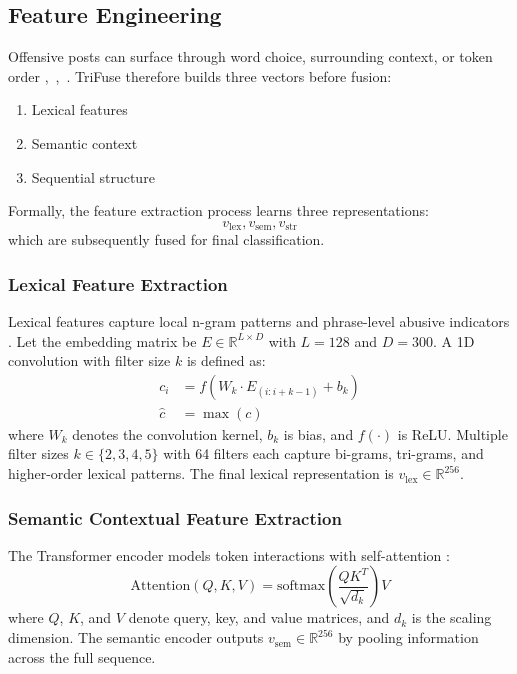 \subsection{Feature Engineering}

Offensive posts can surface through word choice, surrounding context, or token order \cite{ref7},~\cite{ref8},~\cite{ref9}. TriFuse therefore builds three vectors before fusion:
\begin{enumerate}
\item Lexical features
\item Semantic context
\item Sequential structure
\end{enumerate}

Formally, the feature extraction process learns three representations:
\[
v_{\mathrm{lex}}, v_{\mathrm{sem}}, v_{\mathrm{str}}
\]
which are subsequently fused for final classification.

\subsubsection{Lexical Feature Extraction}

Lexical features capture local n-gram patterns and phrase-level abusive indicators \cite{ref7}. Let the embedding matrix be $E \in \mathbb{R}^{L \times D}$ with $L=128$ and $D=300$. A 1D convolution with filter size $k$ is defined as:
\begin{equation}
\begin{aligned}
c_i &= f(W_k \cdot E_{(i:i + k - 1)} + b_k) \\
\hat{c} &= \max(c)
\end{aligned}
\end{equation}
where $W_k$ denotes the convolution kernel, $b_k$ is bias, and $f(\cdot)$ is ReLU. Multiple filter sizes $k \in \{2,3,4,5\}$ with 64 filters each capture bi-grams, tri-grams, and higher-order lexical patterns. The final lexical representation is $v_{\mathrm{lex}} \in \mathbb{R}^{256}$.

\subsubsection{Semantic Contextual Feature Extraction}

The Transformer encoder models token interactions with self-attention \cite{ref9}:
\begin{equation}
\mathrm{Attention}(Q,K,V) = \mathrm{softmax}\!\left(\frac{QK^T}{\sqrt{d_k}}\right)V
\end{equation}
where $Q$, $K$, and $V$ denote query, key, and value matrices, and $d_k$ is the scaling dimension. The semantic encoder outputs $v_{\mathrm{sem}} \in \mathbb{R}^{256}$ by pooling information across the full sequence.

